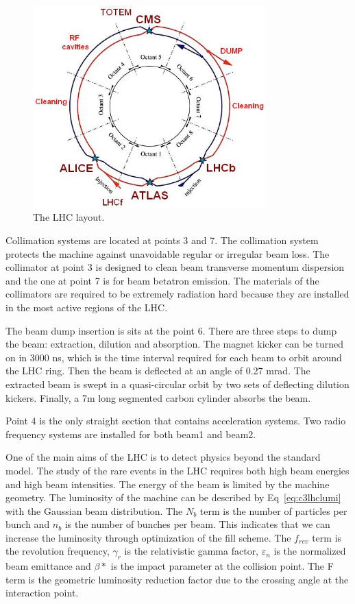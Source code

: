 \begin{figure}[htbp]
 \begin{center}
  \includegraphics[width=0.8\textwidth]{figures/c3/c3_lhc_latticelayout.jpg}
 \end{center}
 \caption{The LHC layout.}
 \label{fig:c3lhclayout}
\end{figure}

Collimation systems\cite{Assmann:691766} are located at points 3 and 7. The collimation system protects the machine against unavoidable regular or irregular beam loss. The collimator at point 3 is designed to clean beam transverse momentum dispersion and the one at point 7 is for beam betatron emission. The materials of the collimators are required to be extremely radiation hard because they are installed in the most active regions of the LHC. 

The beam dump insertion is sits at the point 6. There are three steps to dump the beam: extraction, dilution and absorption. The magnet kicker can be turned on in 3000 ns, which is the time interval required for each beam to orbit around the LHC ring. Then the beam is deflected at an angle of 0.27 mrad. The extracted beam is swept in a quasi-circular orbit by two sets of deflecting dilution kickers. Finally, a 7m long segmented carbon cylinder absorbs the beam.

Point 4 is the only straight section that contains acceleration systems. Two radio frequency systems are installed for both beam1 and beam2. 

One of the main aims of the LHC is to detect physics beyond the standard model. The study of the rare events in the LHC requires both high beam energies and high beam intensities. The energy of the beam is limited by the machine geometry. The luminosity of the machine can be described by Eq~\ref{eq:c3lhclumi} with the Gaussian beam distribution. The $N_{b}$ term is the number of particles per bunch and $n_{b}$ is the number of bunches per beam. This indicates that we can increase the luminosity through optimization of the fill scheme. The $f_{rev}$ term is the revolution frequency, $\gamma_{r}$ is the relativistic gamma factor, $\varepsilon_{n}$ is the normalized beam emittance and $\beta *$ is the impact parameter at the collision point. The F term is the geometric luminosity reduction factor due to the crossing angle at the interaction point. 

